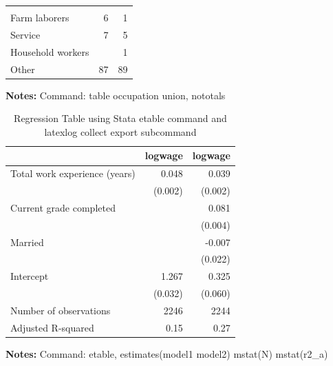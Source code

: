 \documentclass{article}
\begin{document}
\begin{table}[htbp]
\begin{threeparttable}
\begin{tabular}{lll}
  \multicolumn{1}{r}{} \\
\multicolumn{1}{l}{\hspace{1em}Farm laborers} &
  \multicolumn{1}{r}{6} &
  \multicolumn{1}{r}{1} \\
\multicolumn{1}{l}{\hspace{1em}Service} &
  \multicolumn{1}{r}{7} &
  \multicolumn{1}{r}{5} \\
\multicolumn{1}{l}{\hspace{1em}Household workers} &
  \multicolumn{1}{r}{} &
  \multicolumn{1}{r}{1} \\
\multicolumn{1}{l}{\hspace{1em}Other} &
  \multicolumn{1}{r}{87} &
  \multicolumn{1}{r}{89} \\
\bottomrule
\end{tabular}

 \footnotesize  
\textbf{Notes:} Command: table occupation union, nototals 
\end{threeparttable} 
\end{table}
\begin{table}[htbp] 
\centering 
\begin{threeparttable} 
\caption{Regression Table using Stata etable command and latexlog collect export subcommand} 

\centering
\begin{tabular}{lll}
\toprule
\multicolumn{1}{r}{} &
  \multicolumn{1}{c}{logwage} &
  \multicolumn{1}{c}{logwage} \\
\midrule
\multicolumn{1}{l}{Total work experience (years)} &
  \multicolumn{1}{r}{0.048} &
  \multicolumn{1}{r}{0.039} \\
\multicolumn{1}{l}{} &
  \multicolumn{1}{r}{(0.002)} &
  \multicolumn{1}{r}{(0.002)} \\
\multicolumn{1}{l}{Current grade completed} &
  \multicolumn{1}{r}{} &
  \multicolumn{1}{r}{0.081} \\
\multicolumn{1}{l}{} &
  \multicolumn{1}{r}{} &
  \multicolumn{1}{r}{(0.004)} \\
\multicolumn{1}{l}{Married} &
  \multicolumn{1}{r}{} &
  \multicolumn{1}{r}{-0.007} \\
\multicolumn{1}{l}{} &
  \multicolumn{1}{r}{} &
  \multicolumn{1}{r}{(0.022)} \\
\multicolumn{1}{l}{Intercept} &
  \multicolumn{1}{r}{1.267} &
  \multicolumn{1}{r}{0.325} \\
\multicolumn{1}{l}{} &
  \multicolumn{1}{r}{(0.032)} &
  \multicolumn{1}{r}{(0.060)} \\
\multicolumn{1}{l}{Number of observations} &
  \multicolumn{1}{r}{2246} &
  \multicolumn{1}{r}{2244} \\
\multicolumn{1}{l}{Adjusted R-squared} &
  \multicolumn{1}{r}{0.15} &
  \multicolumn{1}{r}{0.27} \\
\bottomrule
\end{tabular}

 \footnotesize  
\textbf{Notes:} Command: etable, estimates(model1 model2) mstat(N) mstat(r2\_a) 
\end{threeparttable} 
\end{table}
\end{document}

